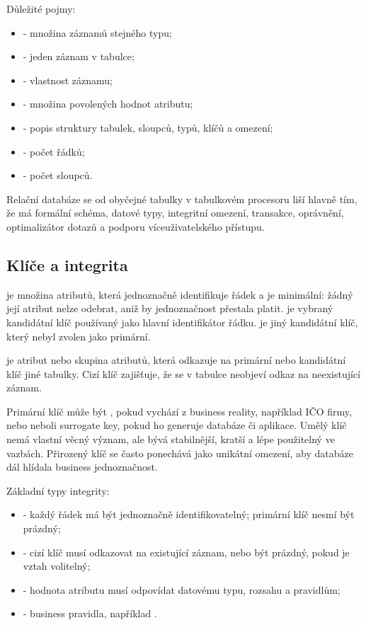 Důležité pojmy:
\begin{itemize}
  \item {} - množina záznamů stejného typu;
  \item {} - jeden záznam v tabulce;
  \item {} - vlastnost záznamu;
  \item {} - množina povolených hodnot atributu;
  \item {} - popis struktury tabulek, sloupců, typů, klíčů a omezení;
  \item {} - počet řádků;
  \item {} - počet sloupců.
\end{itemize}

Relační databáze se od obyčejné tabulky v tabulkovém procesoru liší hlavně tím, že má formální schéma,
datové typy, integritní omezení, transakce, oprávnění, optimalizátor dotazů a podporu víceuživatelského
přístupu.

\subsection{Klíče a integrita}
 je množina atributů, která jednoznačně identifikuje řádek a je minimální:
žádný její atribut nelze odebrat, aniž by jednoznačnost přestala platit.  je
vybraný kandidátní klíč používaný jako hlavní identifikátor řádku.  je jiný
kandidátní klíč, který nebyl zvolen jako primární.

 je atribut nebo skupina atributů, která odkazuje na primární nebo kandidátní klíč
jiné tabulky. Cizí klíč zajišťuje, že se v tabulce neobjeví odkaz na neexistující záznam.

Primární klíč může být , pokud vychází z business reality, například IČO firmy, nebo
 neboli surrogate key, pokud ho generuje databáze či aplikace. Umělý klíč nemá vlastní
věcný význam, ale bývá stabilnější, kratší a lépe použitelný ve vazbách. Přirozený klíč se často
ponechává jako unikátní omezení, aby databáze dál hlídala business jednoznačnost.

Základní typy integrity:
\begin{itemize}
  \item {} - každý řádek má být jednoznačně identifikovatelný; primární klíč
  nesmí být prázdný;
  \item {} - cizí klíč musí odkazovat na existující záznam, nebo být prázdný,
  pokud je vztah volitelný;
  \item {} - hodnota atributu musí odpovídat datovému typu, rozsahu a pravidlům;
  \item {} - business pravidla, například .
\end{itemize}

